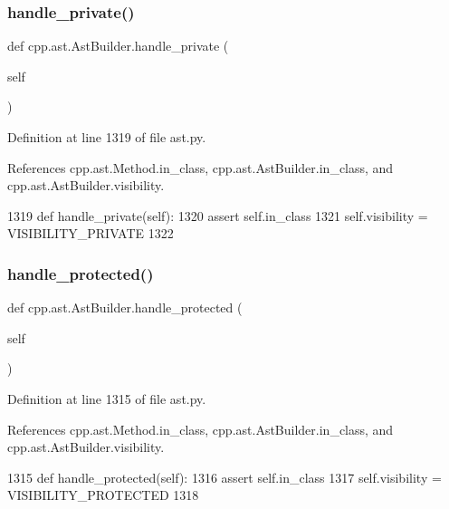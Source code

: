 \subsubsection{\texorpdfstring{handle\+\_\+private()}{handle\_private()}}
{\footnotesize\ttfamily def cpp.\+ast.\+Ast\+Builder.\+handle\+\_\+private (\begin{DoxyParamCaption}\item[{}]{self }\end{DoxyParamCaption})}



Definition at line 1319 of file ast.\+py.



References cpp.\+ast.\+Method.\+in\+\_\+class, cpp.\+ast.\+Ast\+Builder.\+in\+\_\+class, and cpp.\+ast.\+Ast\+Builder.\+visibility.


\begin{DoxyCode}
1319     \textcolor{keyword}{def }handle\_private(self):
1320         \textcolor{keyword}{assert} self.in\_class
1321         self.visibility = VISIBILITY\_PRIVATE
1322 
\end{DoxyCode}
\mbox{\label{classcpp_1_1ast_1_1AstBuilder_aa4ff62142927f8f245a2030b444676ee}} 
\subsubsection{\texorpdfstring{handle\+\_\+protected()}{handle\_protected()}}
{\footnotesize\ttfamily def cpp.\+ast.\+Ast\+Builder.\+handle\+\_\+protected (\begin{DoxyParamCaption}\item[{}]{self }\end{DoxyParamCaption})}



Definition at line 1315 of file ast.\+py.



References cpp.\+ast.\+Method.\+in\+\_\+class, cpp.\+ast.\+Ast\+Builder.\+in\+\_\+class, and cpp.\+ast.\+Ast\+Builder.\+visibility.


\begin{DoxyCode}
1315     \textcolor{keyword}{def }handle\_protected(self):
1316         \textcolor{keyword}{assert} self.in\_class
1317         self.visibility = VISIBILITY\_PROTECTED
1318 
\end{DoxyCode}
\mbox{\label{classcpp_1_1ast_1_1AstBuilder_a1e69925578e0ee0a2b7aeb219eda449b}} 
